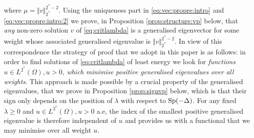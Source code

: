 \documentclass[10pt]{amsart}
\numberwithin{equation}{section}
\newcommand{\Sp}{{\rm Sp}}
\newcommand{\Om}{\Omega}
\theoremstyle{plain}
\theoremstyle{remark}
\begin{document}
where $\mu = \Vert v \Vert_{2^*}^{2^*-2}$. Using the uniqueness part in \eqref{eq:vec:propre:intro} and \eqref{eq:vec:propre:intro:2} we prove, in Proposition \ref{prop:structure:vp} below, that \emph{any} non-zero solution $v$ of \eqref{eq:critlambda} is a generalised eigenvector for some weight whose associated generalised eigenvalue is $\Vert v \Vert_{2^*}^{2^*-2}$. In view of this correspondence the strategy of proof that we adopt in this paper is as follows: in order to find solutions of \eqref{eq:critlambda} of least energy we look for \emph{functions $u \in L^{2^*}(\Om), u >0$, which minimise positive generalised eigenvalues over all weights}. This approach is made possible by a crucial property of the generalised eigenvalues, that we prove in Proposition \ref{prop:signvp} below, which is that their sign only depends on the position of $\lambda$ with respect to $\Sp(-\Delta)$. For any fixed $\lambda \ge 0$ and $u \in L^{2^*}(\Om), u >0$ a.e, the index of the smallest positive generalised eigenvalue is therefore independent of $u$ and provides us with a functional that we may minimise over all weight $u$. 

\medskip
\end{document}
